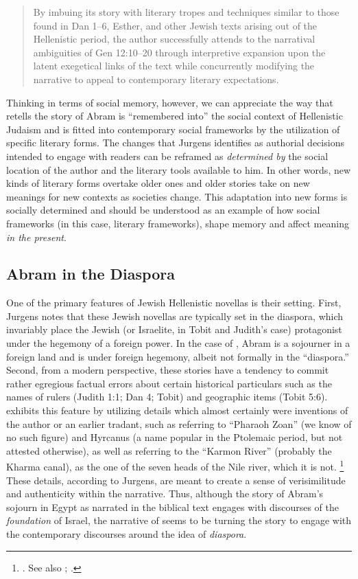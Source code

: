 \begin{quote}
    By imbuing its story with literary tropes and techniques similar to those found in Dan 1--6, Esther, and other Jewish texts arising out of the Hellenistic period, the author successfully attends to the narratival ambiguities of Gen 12:10--20 through interpretive expansion upon the latent exegetical links of the text while concurrently modifying the narrative to appeal to contemporary literary expectations.\autocite[27]{jurgens_jsj2018}
\end{quote}
\noindent
Thinking in terms of social memory, however, we can appreciate the way that \ga retells the story of Abram is ``remembered into'' the social context of Hellenistic Judaism and is fitted into contemporary social frameworks by the utilization of specific literary forms. The changes that Jurgens identifies as authorial decisions intended to engage with readers can be reframed as \emph{determined by} the social location of the author and the literary tools available to him. In other words, new kinds of literary forms overtake older ones and older stories take on new meanings for new contexts as societies change. This adaptation into new forms is socially determined and should be understood as an example of how social frameworks (in this case, literary frameworks), shape memory  and affect meaning \emph{in the present}.

\subsection{Abram in the Diaspora}

One of the primary features of Jewish Hellenistic novellas is their setting. First, Jurgens notes that these Jewish novellas are typically set in the diaspora, which invariably place the Jewish (or Israelite, in Tobit and Judith's case) protagonist under the hegemony of a foreign power. In the case of \ga, Abram is a sojourner in a foreign land and is under foreign hegemony,  albeit not formally in the ``diaspora.'' Second, from a modern perspective, these stories have a tendency to commit rather egregious factual errors about certain historical particulars such as the names of rulers (Judith 1:1; Dan 4; Tobit) and geographic items (Tobit 5:6). \GA exhibits this feature by utilizing details which almost certainly were inventions of the author or an earlier tradant, such as referring to ``Pharaoh Zoan'' (we know of no such figure) and Hyrcanus (a name popular in the Ptolemaic period, but not attested otherwise), as well as referring to the ``Karmon River'' (probably the Kharma canal), as the one of the seven heads of the Nile river, which it is not.%
    \footnote{\Cite[7]{jurgens_jsj2018}. See also 
        \cite[50--59]{machiela_as2010};
        \cite[197--199]{fitzmyer2004}.}
These details, according to Jurgens, are meant to create a sense of verisimilitude and authenticity within the narrative. Thus, although the story of Abram's sojourn in Egypt as narrated in the biblical text engages with discourses of the \emph{foundation} of Israel, the narrative of \ga seems to be turning the story to engage with the contemporary discourses around the idea of \emph{diaspora}. 

